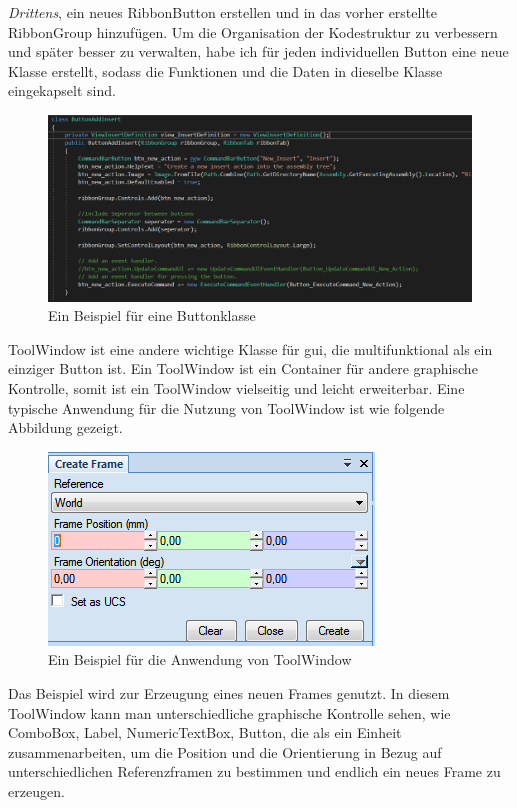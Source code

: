 \documentclass[14pt,a4paper,titlepage]{article}
\begin{document}
\begin{itemize}
				\emph{Drittens},
				 ein neues RibbonButton erstellen und in das vorher erstellte RibbonGroup hinzufügen.
				\bigbreak
				Um die Organisation der Kodestruktur zu verbessern und später besser zu verwalten, habe ich für jeden individuellen Button eine neue Klasse erstellt, sodass die Funktionen und die Daten in dieselbe Klasse eingekapselt sind.
				\bigbreak  
				\begin{figure}[h!]
					\centering
					\includegraphics[width=0.8\linewidth]{buttonclass.png}
					\caption{Ein Beispiel für eine Buttonklasse}
				\end{figure}
				ToolWindow ist eine andere wichtige Klasse für \acs{gui}, die multifunktional als ein einziger Button ist. Ein ToolWindow ist ein Container für andere graphische Kontrolle, somit ist ein ToolWindow vielseitig und leicht erweiterbar.  Eine typische Anwendung für die Nutzung von ToolWindow ist wie folgende Abbildung gezeigt. \\
				\begin{figure}[h!]
					\centering
					\includegraphics[width=0.8\linewidth]{toolwindow.png}
					\caption{Ein Beispiel für die Anwendung von ToolWindow}
				\end{figure}
				\pagebreak
				Das Beispiel wird zur Erzeugung eines neuen Frames genutzt. In diesem ToolWindow kann man unterschiedliche graphische Kontrolle sehen, wie ComboBox, Label, NumericTextBox, Button, die als ein Einheit zusammenarbeiten, um die Position und die Orientierung in Bezug auf unterschiedlichen Referenzframen zu bestimmen und endlich ein neues Frame zu erzeugen.

\end{itemize}
\end{document}
